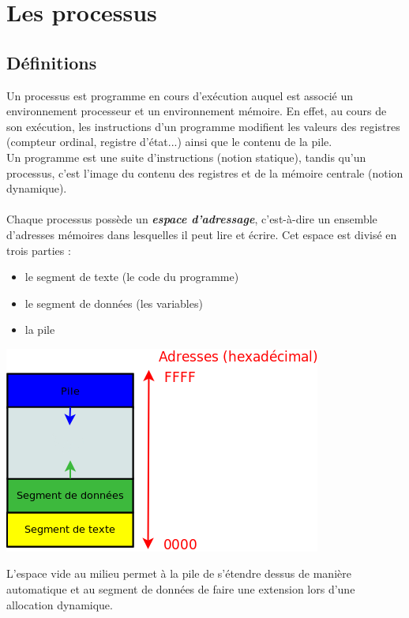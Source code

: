 \section{Les processus}

	\subsection{Définitions}
		Un processus est programme en cours d'exécution auquel est associé un environnement processeur et un environnement mémoire. En effet, au cours de son exécution, les instructions d'un programme modifient les valeurs des registres (compteur ordinal, registre d'état...) ainsi que le contenu de la pile.\\
		Un programme est une suite d'instructions (notion statique), tandis qu'un processus, c'est l'image du contenu des registres et de la mémoire centrale (notion dynamique).
	
		\paragraph{} Chaque processus possède un \textit{\textbf{espace d'adressage}}, c'est-à-dire un ensemble d'adresses mémoires dans lesquelles il peut lire et écrire. Cet espace est divisé en trois parties :
		\begin{itemize}
			\item le segment de texte (le code du programme)
			\item le segment de données (les variables)
			\item la pile
		\end{itemize}
		
		\begin{center}\includegraphics[scale=0.8]{../img/adr.png}\end{center}
		L'espace vide au milieu permet à la pile de s'étendre dessus de manière automatique et au segment de données de faire une extension lors d'une allocation dynamique.
			

